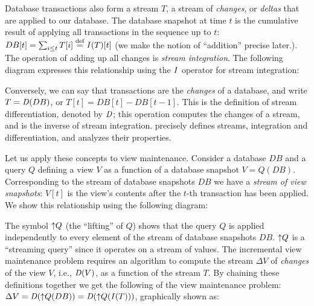 Database transactions also form a stream $T$, a stream of \emph{changes},
or \emph{deltas} that are applied to our database.
The database snapshot at time $t$ is the cumulative result of applying all
transactions in the sequence up to $t$: $DB[t] = \sum_{i \leq t} T[i] \stackrel{\textrm{\scriptsize def}}{=} \mathit{I}(T)[t]$ (we make the notion of ``addition'' precise later.).
The operation of adding up all changes is \emph{stream integration}.
The following diagram expresses this relationship using the $\mathit{I}$ operator for
stream integration:

\begin{center}
\end{center}

Conversely, we can say that transactions are the \emph{changes} of a database, and write
$T = \mathit{D}(DB)$, or $T[t] = DB[t] - DB[t-1]$.  This is the definition of stream differentiation, denoted by $\mathit{D}$; this
operation computes the changes of a stream, and is the
inverse of stream integration.  
precisely defines streams, integration and differentiation, and analyzes
their properties.

Let us apply these concepts to view maintenance.
Consider a database $DB$ and a query $Q$ defining a view $V$ as a function
of a database snapshot $V = Q(DB)$.  Corresponding to the stream of database snapshots
$DB$ we have a \emph{stream of view snapshots}: $V[t]$ is the
view's contents after the $t$-th transaction has been applied.  We show this
relationship using the following diagram:

\begin{center}
\end{center}

The symbol ${\uparrow}Q$ (the ``lifting'' of $Q$) shows that the query $Q$ is applied
independently to every element of the stream of database snapshots $DB$.
${\uparrow}Q$ is a ``streaming query'' since it operates on a stream of values.
The incremental view maintenance problem requires an algorithm to
compute the stream $\Delta V$ of \emph{changes} of the view $V$, i.e., $\mathit{D}(V)$,
as a function of the stream $T$.
By chaining these definitions together we get the following 
of the view maintenance problem: $\Delta V = \mathit{D}({\uparrow}Q(DB)) = \mathit{D}({\uparrow}Q(\mathit{I}(T)))$,
graphically shown as:

